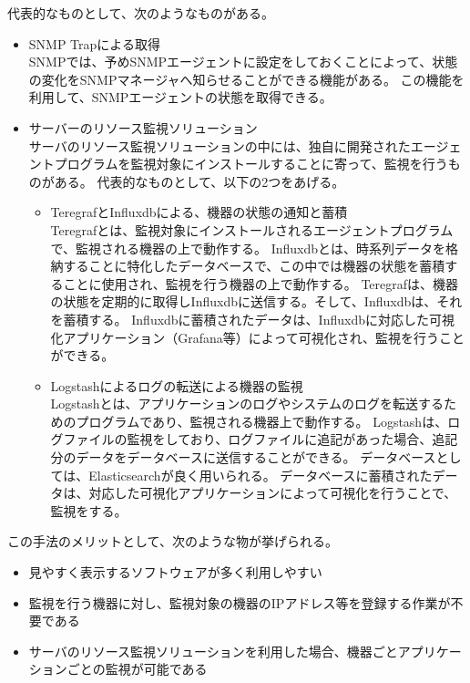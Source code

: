 	代表的なものとして、次のようなものがある。
	\begin{itemize}
		\item SNMP Trapによる取得\\
			SNMPでは、予めSNMPエージェントに設定をしておくことによって、状態の変化をSNMPマネージャへ知らせることができる機能がある。
			この機能を利用して、SNMPエージェントの状態を取得できる。
		\item サーバーのリソース監視ソリューション\\
			サーバのリソース監視ソリューションの中には、独自に開発されたエージェントプログラムを監視対象にインストールすることに寄って、監視を行うものがある。
			代表的なものとして、以下の2つをあげる。
			\begin{itemize}
				\item TeregrafとInfluxdbによる、機器の状態の通知と蓄積\\
					Teregrafとは、監視対象にインストールされるエージェントプログラムで、監視される機器の上で動作する。
					Influxdbとは、時系列データを格納することに特化したデータベースで、この中では機器の状態を蓄積することに使用され、監視を行う機器の上で動作する。
					Teregrafは、機器の状態を定期的に取得しInfluxdbに送信する。そして、Influxdbは、それを蓄積する。
					Influxdbに蓄積されたデータは、Influxdbに対応した可視化アプリケーション（Grafana等）によって可視化され、監視を行うことができる。
				\item Logstashによるログの転送による機器の監視\\
					Logstashとは、アプリケーションのログやシステムのログを転送するためのプログラムであり、監視される機器上で動作する。
					Logstashは、ログファイルの監視をしており、ログファイルに追記があった場合、追記分のデータをデータベースに送信することができる。
					データベースとしては、Elasticsearchが良く用いられる。
					データベースに蓄積されたデータは、対応した可視化アプリケーションによって可視化を行うことで、監視をする。
			\end{itemize}
	\end{itemize}
	
	この手法のメリットとして、次のような物が挙げられる。
	\begin{itemize}
		\item 見やすく表示するソフトウェアが多く利用しやすい
		\item 監視を行う機器に対し、監視対象の機器のIPアドレス等を登録する作業が不要である
		\item サーバのリソース監視ソリューションを利用した場合、機器ごとアプリケーションごとの監視が可能である
	\end{itemize}
	
